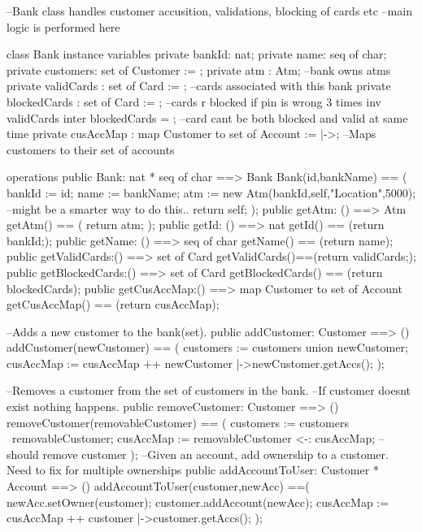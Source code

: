 \documentclass[a4paper]{article}
\begin{document}
\title{}
\author{}
\begin{vdm_al}
--Bank class handles customer accusition, validations, blocking of cards etc
--main logic is performed here

class Bank
instance variables
    private bankId: nat;
    private name: seq of char;
    private customers: set of Customer := {};
    private atm : Atm; --bank owns atms
    private validCards : set of Card := {}; --cards associated with this bank
    private blockedCards : set of Card := {}; --cards r blocked if pin is wrong 3 times
    inv validCards inter blockedCards = {}; --card cant be both blocked and valid at same time
    private cusAccMap : map Customer to set of Account := {|->};
    --Maps customers to their set of accounts

operations
    public Bank: nat * seq of char ==> Bank
    Bank(id,bankName) == (
        bankId := id;
        name := bankName;
        atm := new Atm(bankId,self,"Location",5000); --might be a smarter way to do this..
        return self;
    ); 
    public getAtm: () ==> Atm
    getAtm() == (
        return atm;
    );
    public getId: () ==> nat
    getId() == (return bankId;);
    public getName: () ==> seq of char 
    getName() == (return name);
    public getValidCards:() ==> set of Card
    getValidCards()==(return validCards;);
    public getBlockedCards:() ==> set of Card
    getBlockedCards() == (return blockedCards);
    public getCusAccMap:() ==> map Customer to set of Account
    getCusAccMap() == (return cusAccMap);

    --Adds a new customer to the bank(set).
    public addCustomer: Customer ==> ()
    addCustomer(newCustomer) == (
        customers := customers union {newCustomer};
        cusAccMap := cusAccMap ++ {newCustomer |->newCustomer.getAccs()};
    ); 

    --Removes a customer from the set of customers in the bank. 
    --If customer doesnt exist nothing happens. 
    public removeCustomer: Customer ==> ()
    removeCustomer(removableCustomer) == (
        customers := customers \ {removableCustomer};
        cusAccMap := {removableCustomer} <-: cusAccMap; --should remove customer
    );
    --Given an account, add ownership to a customer. Need to fix for multiple ownerships
    public addAccountToUser: Customer * Account ==> () 
    addAccountToUser(customer,newAcc) ==(
        newAcc.setOwner(customer);
        customer.addAccount(newAcc);
        cusAccMap := cusAccMap ++ {customer |->customer.getAccs()};
    );


\end{vdm_al}
\end{document}
